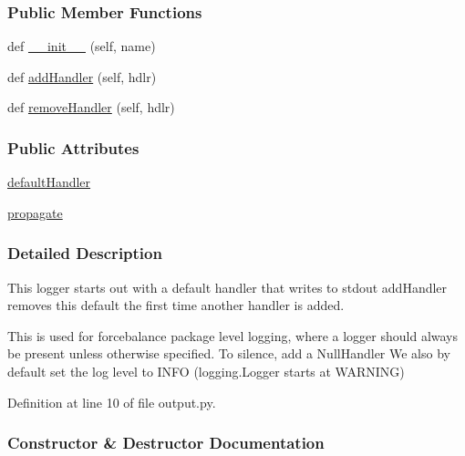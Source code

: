 \subsubsection*{Public Member Functions}
\begin{DoxyCompactItemize}
\item 
def \hyperlink{classsrc_1_1output_1_1ForceBalanceLogger_ad58768bef6288ef421d736dfcb34ddad}{\+\_\+\+\_\+init\+\_\+\+\_\+} (self, name)
\item 
def \hyperlink{classsrc_1_1output_1_1ForceBalanceLogger_a81672b6c5dfd96e11a73c6c345533d1f}{add\+Handler} (self, hdlr)
\item 
def \hyperlink{classsrc_1_1output_1_1ForceBalanceLogger_a8be21b79e392b07a93e1718be22b437c}{remove\+Handler} (self, hdlr)
\end{DoxyCompactItemize}
\subsubsection*{Public Attributes}
\begin{DoxyCompactItemize}
\item 
\hyperlink{classsrc_1_1output_1_1ForceBalanceLogger_a02e7ca6f9f9a5daaa2d2f27457e9c1b2}{default\+Handler}
\item 
\hyperlink{classsrc_1_1output_1_1ForceBalanceLogger_a2da24df00a411d1603fcaf2ebef8161f}{propagate}
\end{DoxyCompactItemize}


\subsubsection{Detailed Description}
This logger starts out with a default handler that writes to stdout add\+Handler removes this default the first time another handler is added. 

This is used for forcebalance package level logging, where a logger should always be present unless otherwise specified. To silence, add a Null\+Handler We also by default set the log level to I\+N\+FO (logging.\+Logger starts at W\+A\+R\+N\+I\+NG) 

Definition at line 10 of file output.\+py.



\subsubsection{Constructor \& Destructor Documentation}
\mbox{\label{classsrc_1_1output_1_1ForceBalanceLogger_ad58768bef6288ef421d736dfcb34ddad}} 
